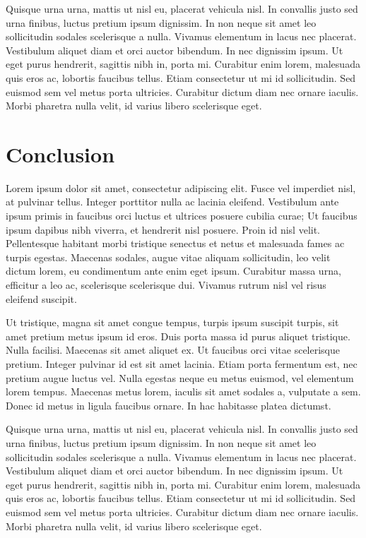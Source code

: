 \documentclass[a4paper,12pt]{report}
\begin{document}
Quisque urna urna, mattis ut nisl eu, placerat vehicula nisl. In convallis justo sed urna finibus, luctus pretium ipsum dignissim. In non neque sit amet leo sollicitudin sodales scelerisque a nulla. Vivamus elementum in lacus nec placerat. Vestibulum aliquet diam et orci auctor bibendum. In nec dignissim ipsum. Ut eget purus hendrerit, sagittis nibh in, porta mi. Curabitur enim lorem, malesuada quis eros ac, lobortis faucibus tellus. Etiam consectetur ut mi id sollicitudin. Sed euismod sem vel metus porta ultricies. Curabitur dictum diam nec ornare iaculis. Morbi pharetra nulla velit, id varius libero scelerisque eget.

\chapter{Conclusion} %

Lorem ipsum dolor sit amet, consectetur adipiscing elit. Fusce vel imperdiet nisl, at pulvinar tellus. Integer porttitor nulla ac lacinia eleifend. Vestibulum ante ipsum primis in faucibus orci luctus et ultrices posuere cubilia curae; Ut faucibus ipsum dapibus nibh viverra, et hendrerit nisl posuere. Proin id nisl velit. Pellentesque habitant morbi tristique senectus et netus et malesuada fames ac turpis egestas. Maecenas sodales, augue vitae aliquam sollicitudin, leo velit dictum lorem, eu condimentum ante enim eget ipsum. Curabitur massa urna, efficitur a leo ac, scelerisque scelerisque dui. Vivamus rutrum nisl vel risus eleifend suscipit.

Ut tristique, magna sit amet congue tempus, turpis ipsum suscipit turpis, sit amet pretium metus ipsum id eros. Duis porta massa id purus aliquet tristique. Nulla facilisi. Maecenas sit amet aliquet ex. Ut faucibus orci vitae scelerisque pretium. Integer pulvinar id est sit amet lacinia. Etiam porta fermentum est, nec pretium augue luctus vel. Nulla egestas neque eu metus euismod, vel elementum lorem tempus. Maecenas metus lorem, iaculis sit amet sodales a, vulputate a sem. Donec id metus in ligula faucibus ornare. In hac habitasse platea dictumst.

Quisque urna urna, mattis ut nisl eu, placerat vehicula nisl. In convallis justo sed urna finibus, luctus pretium ipsum dignissim. In non neque sit amet leo sollicitudin sodales scelerisque a nulla. Vivamus elementum in lacus nec placerat. Vestibulum aliquet diam et orci auctor bibendum. In nec dignissim ipsum. Ut eget purus hendrerit, sagittis nibh in, porta mi. Curabitur enim lorem, malesuada quis eros ac, lobortis faucibus tellus. Etiam consectetur ut mi id sollicitudin. Sed euismod sem vel metus porta ultricies. Curabitur dictum diam nec ornare iaculis. Morbi pharetra nulla velit, id varius libero scelerisque eget.
\end{document}
